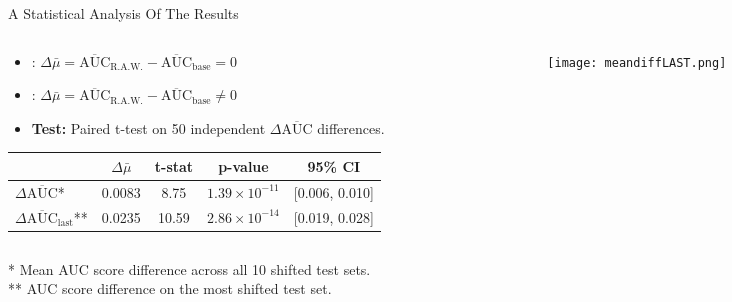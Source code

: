 \begin{frame}{A Statistical Analysis Of The Results}
    \begin{columns}[T]
        \begin{column}{0.6\textwidth}
            \begin{itemize}
                \item {}: $\Delta\bar{\mu} = \overline{\text{AUC}}_{\text{R.A.W.}} - \overline{\text{AUC}}_{\text{base}} = 0$ \\        
                \item {}: $\Delta\bar{\mu} = \overline{\text{AUC}}_{\text{R.A.W.}} - \overline{\text{AUC}}_{\text{base}} \neq 0$ \\
                
                
                \item \textbf{Test:} Paired t-test on 50 independent $\Delta\overline{\text{AUC}}$ differences.
            \end{itemize}
            
            \vspace{0.5em}
            
            \begin{table}
                \centering
                \small
                \begin{tabular}{lcccc}
                    \toprule
                    & $\Delta\bar{\mu}$ & t-stat & p-value & 95\% CI \\
                    \midrule
                    $\Delta\overline{\text{AUC}}$* & 0.0083 & 8.75  & $1.39 \times 10^{-11}$ & [0.006, 0.010] \\
                    $\Delta\overline{\text{AUC}}_{\text{last}}$** & 0.0235 & 10.59 & $2.86 \times 10^{-14}$ & [0.019, 0.028] \\
                    \bottomrule
                \end{tabular}
            \end{table}
        \end{column}
        
        \begin{column}{0.4\textwidth}
            \begin{figure}
                \texttt{[image: meandiffLAST.png]}
            \end{figure}
        \end{column}
    \end{columns}
    
    \begin{footnotesize}
        * Mean AUC score difference across all 10 shifted test sets. \\
        ** AUC score difference on the most shifted test set.
    \end{footnotesize}
\end{frame}


    
